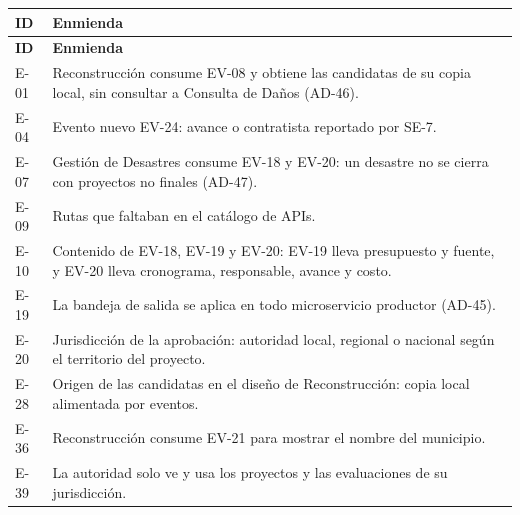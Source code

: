 \documentclass[11pt,a4paper]{article}
\begin{document}
{\small
\begin{longtable}{|P{1.4cm}|P{12.8cm}|}
  \hline
  \textbf{ID} & \textbf{Enmienda} \\ \hline
  \endfirsthead
  \hline
  \textbf{ID} & \textbf{Enmienda} \\ \hline
  \endhead
  E-01 & Reconstrucción consume EV-08 y obtiene las candidatas de su copia local, sin consultar a Consulta de Daños (AD-46). \\ \hline
  E-04 & Evento nuevo EV-24: avance o contratista reportado por SE-7. \\ \hline
  E-07 & Gestión de Desastres consume EV-18 y EV-20: un desastre no se cierra con proyectos no finales (AD-47). \\ \hline
  E-09 & Rutas que faltaban en el catálogo de APIs. \\ \hline
  E-10 & Contenido de EV-18, EV-19 y EV-20: EV-19 lleva presupuesto y fuente, y EV-20 lleva cronograma, responsable, avance y costo. \\ \hline
  E-19 & La bandeja de salida se aplica en todo microservicio productor (AD-45). \\ \hline
  E-20 & Jurisdicción de la aprobación: autoridad local, regional o nacional según el territorio del proyecto. \\ \hline
  E-28 & Origen de las candidatas en el diseño de Reconstrucción: copia local alimentada por eventos. \\ \hline
  E-36 & Reconstrucción consume EV-21 para mostrar el nombre del municipio. \\ \hline
  E-39 & La autoridad solo ve y usa los proyectos y las evaluaciones de su jurisdicción. \\ \hline
\end{longtable}
}
\end{document}
